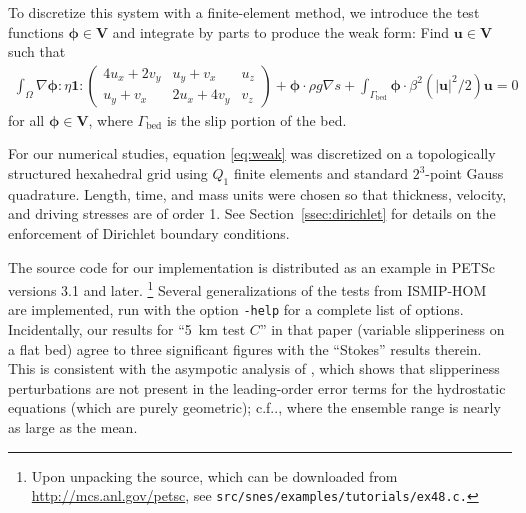 \documentclass[final]{siamltex}
\makeatletter
\newcommand{\citep}[1]{{\cite{#1}}}
\newcommand{\VV}{\bm V}
\newcommand{\abs}[1]{{\left\lvert #1 \right\rvert}}
\newcommand{\tcolon}{{ : }}
\DeclareRobustCommand\onedot{\futurelet\@let@token\@onedot}
\def\@onedot{\ifx\@let@token.\else.\null\fi\xspace}
\def\cf{{c.f}\onedot} \def\Cf{{C.f}\onedot}
\makeatother
\begin{document}
To discretize this system with a finite-element method, we introduce the test functions $\bm \phi
\in \VV$ and integrate by parts to produce the weak form: Find $\bm u \in \VV$ such that
\begin{align}\label{eq:weak}
  \int_\Omega \nabla\bm\phi \tcolon \eta \bm 1 \tcolon
  \begin{pmatrix}
    4 u_x + 2 v_y & u_y + v_x & u_z \\
    u_y + v_x & 2 u_x + 4 v_y & v_z
  \end{pmatrix} + \bm\phi \cdot\rho g \nabla s
  + \int_{\Gamma_{\text{bed}}} \bm \phi \cdot \beta^2(\abs{\bm u}^2/2) \bm u = 0
\end{align}
for all $\bm \phi \in \VV$, where $\Gamma_{\text{bed}}$ is the slip portion of the bed.

For our numerical studies, equation \eqref{eq:weak} was discretized on a topologically structured hexahedral grid using $Q_1$ finite elements and standard $2^3$-point Gauss quadrature.  Length, time, and mass units were chosen so that thickness, velocity, and driving stresses are of order 1.  See Section~\ref{ssec:dirichlet} for details on the enforcement of Dirichlet boundary conditions.

The source code for our implementation is distributed as an example in PETSc~\citep{petsc-web-page} versions 3.1 and later.
\footnote{
Upon unpacking the source, which can be downloaded from \url{http://mcs.anl.gov/petsc}, see \texttt{src/snes/examples/tutorials/ex48.c.}
}
Several generalizations of the tests from ISMIP-HOM~\citep{pattyn2008beh} are implemented, run with the option \texttt{-help} for a complete list of options.  Incidentally, our results for ``\SI{5}{\kilo\metre} test $C$'' in that paper (variable slipperiness on a flat bed) agree to three significant figures with the ``Stokes'' results therein.
This is consistent with the asympotic analysis of \cite{schoof2010thin}, which shows that slipperiness perturbations are not present in the leading-order error terms for the hydrostatic equations (which are purely geometric); \cf \cite[Table~4 and Figure~8]{pattyn2008beh}, where the ensemble range is nearly as large as the mean.
\end{document}
